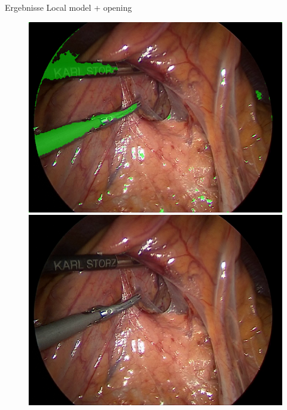 \begin{frame}{Ergebnisse Local model + opening}
\begin{figure}[ht]
\begin{minipage}[b]{0.45\linewidth}
            \includegraphics[width=\textwidth]{../images/model-303/img_06_raw-overlay.png}\\
            \includegraphics[width=\textwidth]{../images/op4-img_05.png}
        \end{minipage}
    \end{figure}
\end{frame}

